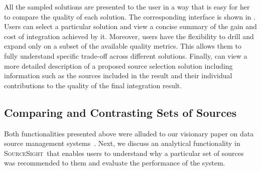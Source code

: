 \documentclass{vldb}
\newcommand\system{\textsc{SourceSight}}
\begin{document}
All the sampled solutions are presented to the user in a way that is easy for her to compare the quality of each solution. The corresponding interface is shown in . Users can select a particular solution and view a concise summary of the gain and cost of integration achieved by it. Moreover,  users have the flexibility to drill and expand only on a subset of the available quality metrics. This allows them to fully understand specific trade-off across different solutions. Finally, can view a more detailed description of a proposed source selection solution including information such as the sources included in the result and their individual contributions to the quality of the final integration result. 

\subsection{Comparing and Contrasting Sets of Sources}
\label{sec:extensions}
Both functionalities presented above were alluded to our visionary paper on data source management systems~\cite{rekatsinas:2015}. Next, we discuss an analytical functionality in \system~that enables users to understand why a particular set of sources was recommended to them and evaluate the performance of the system.
\end{document}
